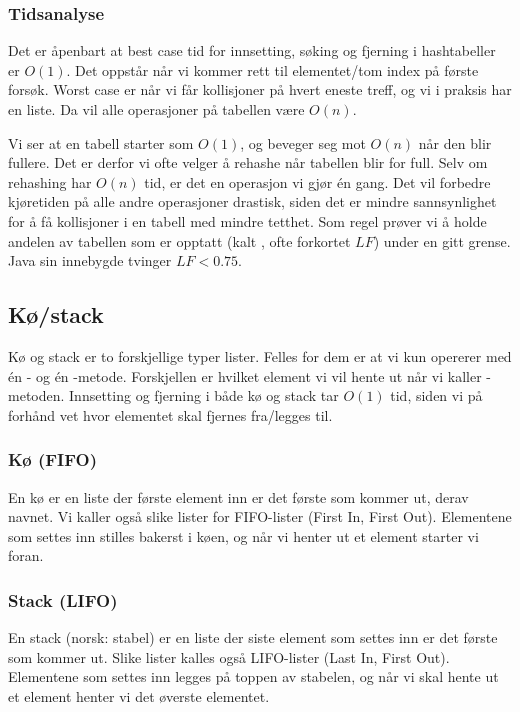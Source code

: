 \subsubsection{Tidsanalyse}
Det er åpenbart at best case tid for innsetting, søking og fjerning i hashtabeller er $ O(1) $. Det oppstår når vi kommer rett til elementet/tom index på første forsøk. Worst case er når vi får kollisjoner på hvert eneste treff, og vi i praksis har en liste. Da vil alle operasjoner på tabellen være $ O(n) $. 

Vi ser at en tabell starter som $ O(1) $, og beveger seg mot $ O(n) $ når den blir fullere. Det er derfor vi ofte velger å rehashe når tabellen blir for full. Selv om rehashing har $ O(n) $ tid, er det en operasjon vi gjør én gang. Det vil forbedre kjøretiden på alle andre operasjoner drastisk, siden det er mindre sannsynlighet for å få kollisjoner i en tabell med mindre tetthet. Som regel prøver vi å holde andelen av tabellen som er opptatt (kalt , ofte forkortet $ LF $) under en gitt grense. Java sin innebygde  tvinger $ LF < 0.75 $.





\subsection{Kø/stack} \label{ko_stack}
Kø og stack er to forskjellige typer lister. Felles for dem er at vi kun opererer med én - og én -metode. Forskjellen er hvilket element vi vil hente ut når vi kaller -metoden. Innsetting og fjerning i både kø og stack tar $ O(1) $ tid, siden vi på forhånd vet hvor elementet skal fjernes fra/legges til. 


\subsubsection{Kø (FIFO)}
En kø er en liste der første element inn er det første som kommer ut, derav navnet. Vi kaller også slike lister for FIFO-lister (First In, First Out). Elementene som settes inn stilles bakerst i køen, og når vi henter ut et element starter vi foran. 


\subsubsection{Stack (LIFO)}
En stack (norsk: stabel) er en liste der siste element som settes inn er det første som kommer ut. Slike lister kalles også LIFO-lister (Last In, First Out). Elementene som settes inn legges på toppen av stabelen, og når vi skal hente ut et element henter vi det øverste elementet. 

